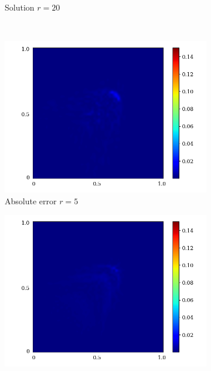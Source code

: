 \begin{figure}[!htb]
\begin{center}
\begin{subfigure}[b]{0.23\textwidth}
\begin{center}
            \end{center}
             \caption{Solution $r = 20$}
         \end{subfigure}\\  
         \begin{subfigure}[b]{0.23\textwidth}
             \begin{center}
                \includegraphics[trim = {0, 0, 3cm, 0}, clip, width=\textwidth]{Pictures/X-rom-LE-CNNAE-5-abs-err.png}
             \end{center}
             \caption{Absolute error $r = 5$}
         \end{subfigure}  
         \begin{subfigure}[b]{0.23\textwidth}
             \begin{center}
                \includegraphics[trim = {0, 0, 3cm, 0}, clip, width=\textwidth]{Pictures/X-rom-LE-CNNAE-10-abs-err.png}

\end{center}
\end{subfigure}
\end{center}
\end{figure}

